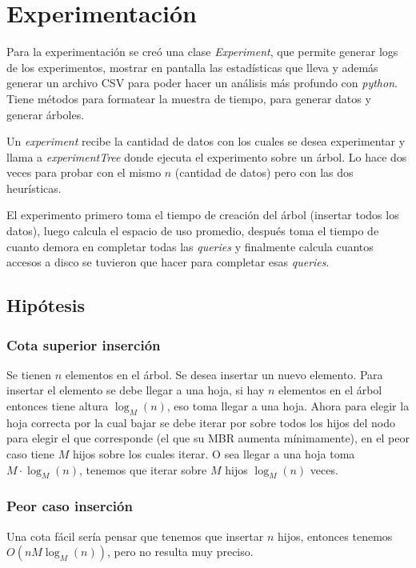 \documentclass[letterpaper,11pt]{article} %
\begin{document}
\section{Experimentación}

	Para la experimentación se creó una clase \textit{Experiment}, que permite generar logs de los experimentos, mostrar en pantalla las estadísticas que lleva y además generar un archivo CSV para poder hacer un análisis más profundo con \textit{python}. Tiene métodos para formatear la muestra de tiempo, para generar datos y generar árboles.
	
	Un \textit{experiment} recibe la cantidad de datos con los cuales se desea experimentar y llama a \textit{experimentTree} donde ejecuta el experimento sobre un árbol. Lo hace dos veces para probar con el mismo $n$ (cantidad de datos) pero con las dos heurísticas.
	
	El experimento primero toma el tiempo de creación del árbol (insertar todos los datos), luego calcula el espacio de uso promedio, después toma el tiempo de cuanto demora en completar todas las \textit{queries} y finalmente calcula cuantos accesos a disco se tuvieron que hacer para completar esas \textit{queries}.
	
	\subsection{Hipótesis}
	
		\subsubsection{Cota superior inserción}
			Se tienen $n$ elementos en el árbol. Se desea insertar un nuevo elemento. Para insertar el elemento se debe llegar a una hoja, si hay $n$ elementos en el árbol entonces tiene altura $\log_{M}(n)$, eso toma llegar a una hoja. Ahora para elegir la hoja correcta por la cual bajar se debe iterar por sobre todos los hijos del nodo para elegir el que corresponde (el que su MBR aumenta mínimamente), en el peor caso tiene $M$ hijos sobre los cuales iterar. O sea llegar a una hoja toma $M\cdot \log_{M}(n)$, tenemos que iterar sobre $M$ hijos $\log_{M}(n)$ veces.
			
		\subsubsection{Peor caso inserción}
			Una cota fácil sería pensar que tenemos que insertar $n$ hijos, entonces tenemos $O(nM \log_{M}(n))$, pero no resulta muy preciso.
			
\end{document}
